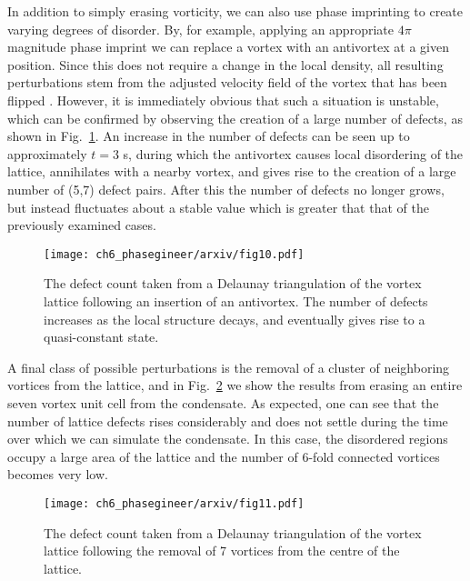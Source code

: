 
In addition to simply erasing vorticity, we can also use phase imprinting to create varying degrees of disorder. By, for example, applying an appropriate $4\pi$ magnitude phase imprint we can replace a vortex with an antivortex at a given position. Since this does not require a change in the local density, all resulting perturbations stem from the adjusted velocity field of the vortex that has been flipped \cite{VTX:Madarassy_gfd_2009}. However, it is immediately obvious that such a situation is unstable, which can be confirmed by observing the creation of a large number of defects, as shown in Fig.~\ref{fig:varr161anti_defect}. An increase in the number of defects can be seen up to approximately $t=3$ s, during which the antivortex causes local disordering of the lattice, annihilates with a nearby vortex, and gives rise to the creation of a large number of (5,7) defect pairs. After this the number of defects no longer grows, but instead fluctuates about a stable value which is greater that that of the previously examined cases.

\begin{figure}[h!]\centering
    \texttt{[image: ch6\_phasegineer/arxiv/fig10.pdf]}
    \caption{The defect count taken from a Delaunay triangulation of the vortex lattice following an insertion of an antivortex. The number of defects increases as the local structure decays, and eventually gives rise to a quasi-constant state.}\label{fig:varr161anti_defect}
\end{figure}

A final class of possible perturbations is the removal of a cluster of neighboring vortices from the lattice, and in Fig.~\ref{fig:remove7_defect} we show the results from erasing an entire seven vortex unit cell from the condensate. As expected, one can see that the number of lattice defects rises considerably and does not settle during the time over which we can simulate the condensate. In this case, the disordered regions occupy a large area of the lattice and the number of 6-fold connected vortices becomes very low.

\begin{figure}[h!]\centering
    \texttt{[image: ch6\_phasegineer/arxiv/fig11.pdf]}
    \caption{The defect count taken from a Delaunay triangulation of the vortex lattice following the removal of 7 vortices from the centre of the lattice. }\label{fig:remove7_defect}
\end{figure}


